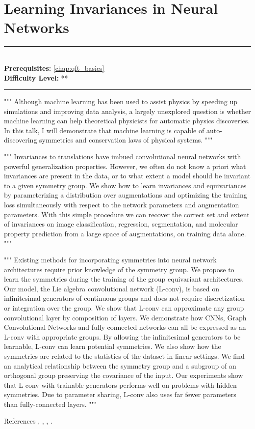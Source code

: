 \documentclass[book.tex]{subfiles}
\begin{document}
\chapter{Learning Invariances in Neural Networks}

\label{chap:learning_invariance}
\noindent\rule{11cm}{0.4pt} \\
\textbf{Prerequisites:} \autoref{chap:qft_basics}  \\
\textbf{Difficulty Level:} ** \\
\noindent\rule{11cm}{0.4pt}
\vspace{5mm}

"""
Although machine learning has been used to assist physics by speeding up simulations and improving data analysis, a largely unexplored question is whether machine learning can help theoretical physicists for automatic physics discoveries. In this talk, I will demonstrate that machine learning is capable of auto-discovering symmetries and conservation laws of physical systems.
"""

"""
Invariances to translations have imbued convolutional neural networks with powerful generalization properties. However, we often do not know a priori what invariances are present in the data, or to what extent a model should be invariant to a given symmetry group. We show how to learn invariances and equivariances by parameterizing a distribution over augmentations and optimizing the training loss simultaneously with respect to the network parameters and augmentation parameters. With this simple procedure we can recover the correct set and extent of invariances on image classification, regression, segmentation, and molecular property prediction from a large space of augmentations, on training data alone.
"""

"""
Existing methods for incorporating symmetries into neural network architectures require prior knowledge of the symmetry group. We propose to learn the symmetries during the training of the group equivariant architectures. Our model, the Lie algebra convolutional network (L-conv), is based on infinitesimal generators of continuous groups and does not require discretization or integration over the group. We show that L-conv can approximate any group convolutional layer by composition of layers. We demonstrate how CNNs, Graph Convolutional Networks and fully-connected networks can all be expressed as an L-conv with appropriate groups. By allowing the infinitesimal generators to be learnable, L-conv can learn potential symmetries. We also show how the symmetries are related to the statistics of the dataset in linear settings. We find an analytical relationship between the symmetry group and a subgroup of an orthogonal group preserving the covariance of the input. Our experiments show that L-conv with trainable generators performs well on problems with hidden symmetries. Due to parameter sharing, L-conv also uses far fewer parameters than fully-connected layers.
"""

References \cite{benton2020learning}, \cite{dehmamy2020lie}, \cite{liu2020ai}, \cite{liu2021machine}.
\end{document}
